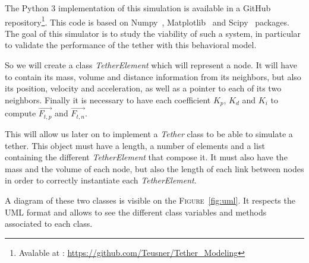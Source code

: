 The Python 3 implementation of this simulation is available in a GitHub repository\footnote{Avalable at : \url{https://github.com/Teusner/Tether\_Modeling}}. This code is based on Numpy~\cite{numpy}, Matplotlib~\cite{matplotlib} and Scipy~\cite{scipy} packages. The goal of this simulator is to study the viability of such a system, in particular to validate the performance of the tether with this behavioral model.

So we will create a class \textit{TetherElement} which will represent a node. It will have to contain its mass, volume and distance information from its neighbors, but also its position, velocity and acceleration, as well as a pointer to each of its two neighbors. Finally it is necessary to have each coefficient $K_p$, $K_d$ and $K_i$ to compute $\overrightarrow{F_{t, p}}$ and $\overrightarrow{F_{t, n}}$.

This will allow us later on to implement a \textit{Tether} class to be able to simulate a tether. This object must have a length, a number of elements and a list containing the different \textit{TetherElement} that compose it. It must also have the mass and the volume of each node, but also the length of each link between nodes in order to correctly instantiate each \textit{TetherElement}.

A diagram of these two classes is visible on the \textsc{Figure}~\ref{fig:uml}. It respects the \textsc{UML} format and allows to see the different class variables and methods associated to each class.

